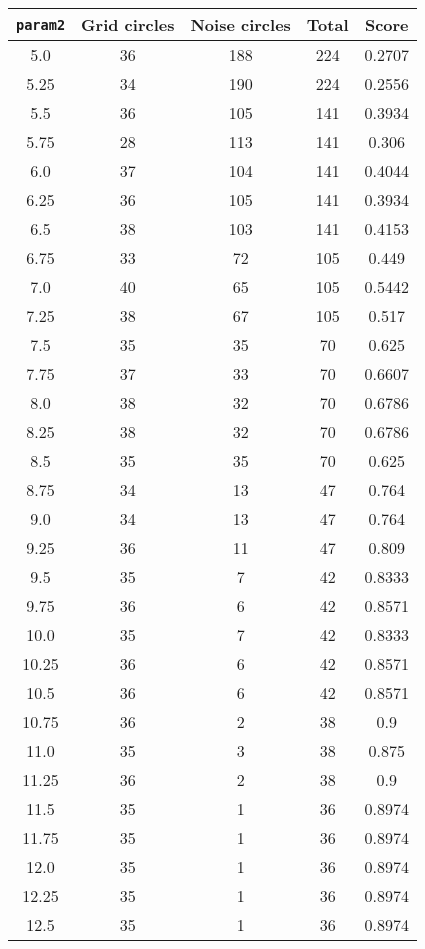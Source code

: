 \documentclass[letterpaper, 12pt]{article}
\begin{document}
\begin{longtable}{|c|c|c|c|c|}
\hline
\textbf{\texttt{param2}} & \textbf{Grid circles} & \textbf{Noise circles} & \textbf{Total} & \textbf{Score} \\
\hline
5.0 & 36 & 188 & 224 & 0.2707 \\
\hline
5.25 & 34 & 190 & 224 & 0.2556 \\
\hline
5.5 & 36 & 105 & 141 & 0.3934 \\
\hline
5.75 & 28 & 113 & 141 & 0.306 \\
\hline
6.0 & 37 & 104 & 141 & 0.4044 \\
\hline
6.25 & 36 & 105 & 141 & 0.3934 \\
\hline
6.5 & 38 & 103 & 141 & 0.4153 \\
\hline
6.75 & 33 & 72 & 105 & 0.449 \\
\hline
7.0 & 40 & 65 & 105 & 0.5442 \\
\hline
7.25 & 38 & 67 & 105 & 0.517 \\
\hline
7.5 & 35 & 35 & 70 & 0.625 \\
\hline
7.75 & 37 & 33 & 70 & 0.6607 \\
\hline
8.0 & 38 & 32 & 70 & 0.6786 \\
\hline
8.25 & 38 & 32 & 70 & 0.6786 \\
\hline
8.5 & 35 & 35 & 70 & 0.625 \\
\hline
8.75 & 34 & 13 & 47 & 0.764 \\
\hline
9.0 & 34 & 13 & 47 & 0.764 \\
\hline
9.25 & 36 & 11 & 47 & 0.809 \\
\hline
9.5 & 35 & 7 & 42 & 0.8333 \\
\hline
9.75 & 36 & 6 & 42 & 0.8571 \\
\hline
10.0 & 35 & 7 & 42 & 0.8333 \\
\hline
10.25 & 36 & 6 & 42 & 0.8571 \\
\hline
10.5 & 36 & 6 & 42 & 0.8571 \\
\hline
10.75 & 36 & 2 & 38 & 0.9 \\
\hline
11.0 & 35 & 3 & 38 & 0.875 \\
\hline
11.25 & 36 & 2 & 38 & 0.9 \\
\hline
11.5 & 35 & 1 & 36 & 0.8974 \\
\hline
11.75 & 35 & 1 & 36 & 0.8974 \\
\hline
12.0 & 35 & 1 & 36 & 0.8974 \\
\hline
12.25 & 35 & 1 & 36 & 0.8974 \\
\hline
12.5 & 35 & 1 & 36 & 0.8974 \\

\end{longtable}
\end{document}

